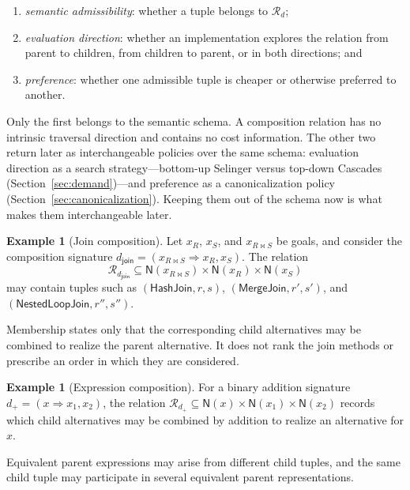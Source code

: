 \documentclass[sigconf,nonacm]{acmart}
\theoremstyle{definition}
\newtheorem{example}[definition]{Example}
\theoremstyle{plain}
\theoremstyle{remark}
\begin{document}
\begin{enumerate}

\item
\emph{semantic admissibility}: whether a tuple belongs to
\(\mathcal{R}_d\);

\item
\emph{evaluation direction}: whether an implementation explores the
relation from parent to children, from children to parent, or in both
directions; and

\item
\emph{preference}: whether one admissible tuple is cheaper or otherwise
preferred to another.

\end{enumerate}

Only the first belongs to the semantic schema.  A composition relation
has no intrinsic traversal direction and contains no cost information.
The other two return later as interchangeable policies over the same
schema: evaluation direction as a search strategy---bottom-up
Selinger versus top-down Cascades (Section~\ref{sec:demand})---and
preference as a canonicalization policy
(Section~\ref{sec:canonicalization}).  Keeping them out of the
schema now is what makes them interchangeable later.

\begin{example}[Join composition]
Let \(x_R\), \(x_S\), and \(x_{R \Join S}\) be goals, and consider
the composition signature
\(d_{\mathsf{join}} = ( x_{R \Join S} \Rightarrow x_R,x_S )\).
The relation
\[
\mathcal{R}_{d_{\mathsf{join}}}
\subseteq
\mathsf{N}(x_{R \Join S})
\times
\mathsf{N}(x_R)
\times
\mathsf{N}(x_S)
\]
may contain tuples such as \((\mathsf{HashJoin},r,s)\),
\((\mathsf{MergeJoin},r',s')\), and
\((\mathsf{NestedLoopJoin},r'',s'')\).

Membership states only that the corresponding child alternatives may
be combined to realize the parent alternative.  It does not rank the
join methods or prescribe an order in which they are considered.
\end{example}

\begin{example}[Expression composition]
For a binary addition signature \(d_{+} = (x \Rightarrow x_1,x_2)\),
the relation
\(\mathcal{R}_{d_{+}}
\subseteq
\mathsf{N}(x)\times\mathsf{N}(x_1)\times\mathsf{N}(x_2)\)
records which child alternatives may be combined by addition to realize
an alternative for \(x\).

Equivalent parent expressions may arise from different child tuples,
and the same child tuple may participate in several equivalent parent
representations.
\end{example}
\end{document}
